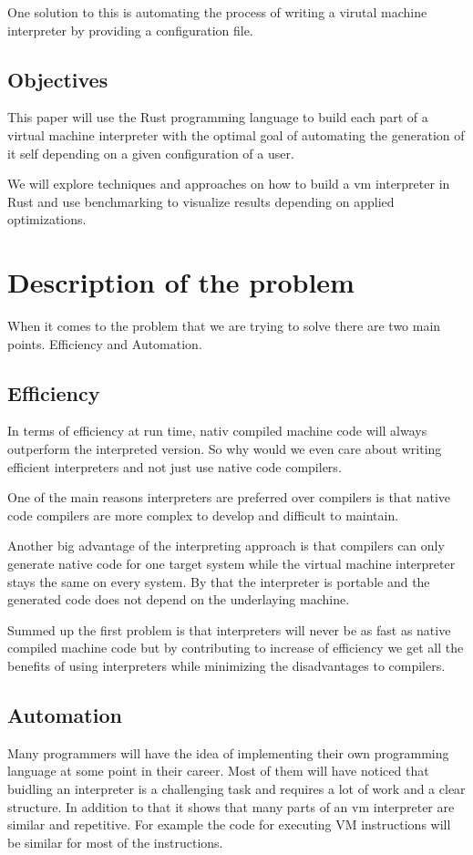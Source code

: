 \documentclass{article}
\begin{document}
One solution to this is automating the process of writing a virutal machine interpreter
by providing a configuration file.

\subsection{Objectives}
This paper will use the Rust programming language to build each part of a virtual machine 
interpreter with the optimal goal of automating the generation of it self depending on
a given configuration of a user.

We will explore techniques and approaches on how to build a vm interpreter in Rust and
use benchmarking to visualize results depending on applied optimizations.

\section{Description of the problem}
When it comes to the problem that we are trying to solve there are two main
points. Efficiency and Automation.

\subsection{Efficiency}
In terms of efficiency at run time, nativ compiled machine code will always
outperform the interpreted version. So why would we even care about writing
efficient interpreters and not just use native code compilers.

One of the main reasons interpreters are preferred over compilers is that 
native code compilers are more complex to develop and difficult to maintain.
~\cite{structure_and_performance}

Another big advantage of the interpreting approach is that compilers can only
generate native code for one target system while the virtual machine
interpreter stays the same on every system. By that the interpreter is portable
and the generated code does not depend on the underlaying machine.

Summed up the first problem is that interpreters will never be as fast as
native compiled machine code but by contributing to increase of efficiency we
get all the benefits of using interpreters while minimizing the disadvantages
to compilers.

\subsection{Automation}
Many programmers will have the idea of implementing their own programming
language at some point in their career. Most of them will have noticed that
buidling an interpreter is a challenging task and requires a lot of work and
a clear structure. In addition to that it shows that many parts of an vm
interpreter are similar and repetitive. For example the code for executing 
VM instructions will be similar for most of the instructions. ~\cite{vmgen}
\end{document}
